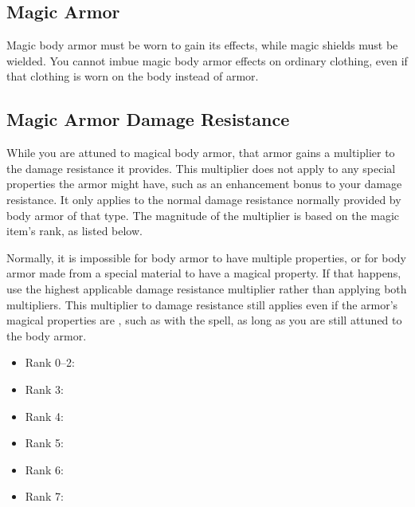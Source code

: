       \begin{longcolumn}
        \section{Magic Armor}\label{Magic Armor}
          \begin{longtablepreface}
            Magic body armor must be worn to gain its effects, while magic shields must be wielded.
            You cannot imbue magic body armor effects on ordinary clothing, even if that clothing is worn on the body instead of armor.

            \subsection{Magic Armor Damage Resistance}\label{Magic Armor Damage Resistance}
              While you are attuned to magical body armor, that armor gains a multiplier to the damage resistance it provides.
              This multiplier does not apply to any special properties the armor might have, such as an enhancement bonus to your damage resistance.
              It only applies to the normal damage resistance normally provided by body armor of that type.
              The magnitude of the multiplier is based on the magic item's rank, as listed below.

              Normally, it is impossible for body armor to have multiple properties, or for body armor made from a special material to have a magical property.
              If that happens, use the highest applicable damage resistance multiplier rather than applying both multipliers.
              This multiplier to damage resistance still applies even if the armor's magical properties are , such as with the  spell, as long as you are still attuned to the body armor.

              \begin{itemize}
                \item Rank 0--2: 
                \item Rank 3: 
                \item Rank 4: 
                \item Rank 5: 
                \item Rank 6: 
                \item Rank 7: 
              \end{itemize}
          \end{longtablepreface}

          

      \end{longcolumn}

